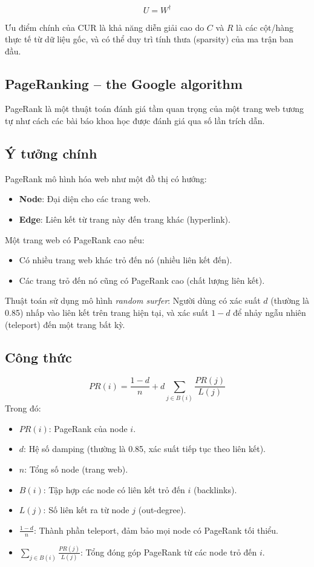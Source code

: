 \documentclass[conference]{IEEEtran}
\begin{document}
\[
U = W^{\dagger}
\]

Ưu điểm chính của CUR là khả năng diễn giải cao do $C$ và $R$ là các cột/hàng thực tế từ dữ liệu gốc, và có thể duy trì tính thưa (sparsity) của ma trận ban đầu.

\subsection{PageRanking – the Google algorithm}
PageRank là một thuật toán đánh giá tầm quan trọng của một trang web tương tự như cách các bài báo khoa học được đánh giá qua số lần trích dẫn.

\subsection*{Ý tưởng chính}
PageRank mô hình hóa web như một đồ thị có hướng:
\begin{itemize}
    \item \textbf{Node}: Đại diện cho các trang web.
    \item \textbf{Edge}: Liên kết từ trang này đến trang khác (hyperlink).
\end{itemize}
Một trang web có PageRank cao nếu:
\begin{itemize}
    \item Có nhiều trang web khác trỏ đến nó (nhiều liên kết đến).
    \item Các trang trỏ đến nó cũng có PageRank cao (chất lượng liên kết).
\end{itemize}
Thuật toán sử dụng mô hình \textit{random surfer}: Người dùng có xác suất \( d \) (thường là 0.85) nhấp vào liên kết trên trang hiện tại, và xác suất \( 1-d \) để nhảy ngẫu nhiên (teleport) đến một trang bất kỳ.

\subsection*{Công thức}
\begin{equation}
PR(i) = \frac{1-d}{n} + d \sum_{j \in B(i)} \frac{PR(j)}{L(j)}
\end{equation}
Trong đó:
\begin{itemize}
    \item \( PR(i) \): PageRank của node \( i \).
    \item \( d \): Hệ số damping (thường là 0.85, xác suất tiếp tục theo liên kết).
    \item \( n \): Tổng số node (trang web).
    \item \( B(i) \): Tập hợp các node có liên kết trỏ đến \( i \) (backlinks).
    \item \( L(j) \): Số liên kết ra từ node \( j \) (out-degree).
    \item \( \frac{1-d}{n} \): Thành phần teleport, đảm bảo mọi node có PageRank tối thiểu.
    \item \( \sum_{j \in B(i)} \frac{PR(j)}{L(j)} \): Tổng đóng góp PageRank từ các node trỏ đến \( i \).
\end{itemize}
\end{document}
